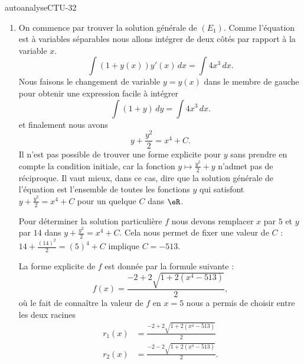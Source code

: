 
\begin{corrige}{autoanalyseCTU-32}

\begin{enumerate}
\item On commence par trouver la solution générale de $(E_{1})$. Comme l'équation est à variables séparables nous allons intégrer de deux c\^otés par rapport à la variable $x$. 
\[
\int (1+y(x))y'(x)\, dx = \int 4x^3\, dx.
\]
Nous faisons le changement de variable $y = y(x) $ dans le membre de gauche pour obtenir une expression facile à intégrer 
\[
\int (1+y)\, dy = \int 4x^3\, dx.
\]
et finalement nous avons 
\[
y+ \frac{y^2}{2} = x^4 + C.
\]
Il n'est pas possible de trouver une forme explicite pour $y$ sans prendre en compte la condition initiale, car la fonction $y\mapsto  \frac{y^2}{2}+ y $ n'admet pas de réciproque. Il vaut mieux, dans ce cas, dire que la solution générale de l'équation est l'ensemble de toutes les  fonctions $y$ qui satisfont $y+ \frac{y^2}{2} = x^4 + C$ pour un quelque $C$ dans $\eR$. 

Pour déterminer la solution particulière $f$ nous devons remplacer $x$ par $5$ et $y$ par $14$ dans $y+ \frac{y^2}{2} = x^4 + C$. Cela nous permet de fixer une valeur de $C$ : $14+ \frac{(14)^2}{2}  = (5)^4 + C$ implique $ C=-513$. 

La forme explicite de $f$ est donnée par la formule suivante :
\[
f(x) = \frac{-2+ 2\sqrt{1 + 2 (x^4 - 513)}}{2},
\] 
où le fait de conna\^{i}tre la valeur de $f$ en $x=5$ nous a permis de choisir entre les deux racines 
\begin{subequations}
    \begin{align}
        r_1(x)&=\frac{-2+ 2\sqrt{1 + 2 (x^4 - 513)}}{2}\\
        r_2(x)&= \frac{-2- 2\sqrt{1 + 2 (x^4 - 513)}}{2}.
    \end{align}
\end{subequations}
  

\end{enumerate}
\end{corrige}
